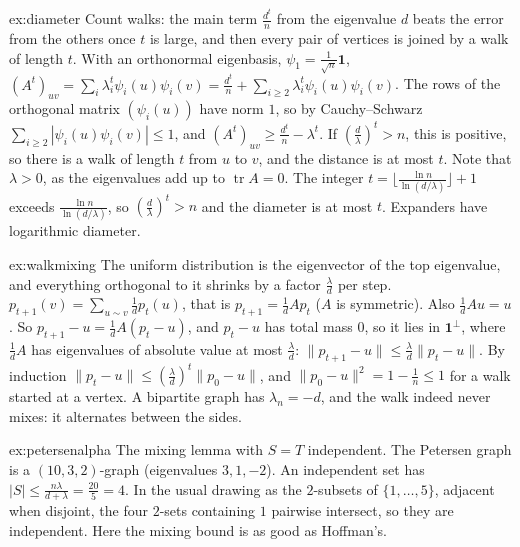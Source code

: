 \begin{solution}{ex:diameter}
\idea Count walks: the main term $\frac{d^t}n$ from the eigenvalue $d$ beats the error from the others once $t$ is large, and then every pair of vertices is joined by a walk of length $t$.
\writeup With an orthonormal eigenbasis, $\psi_1=\frac1{\sqrt n}\mathbf1$, $(A^t)_{uv}=\sum_i\lambda_i^t\psi_i(u)\psi_i(v)=\frac{d^t}n+\sum_{i\ge2}\lambda_i^t\psi_i(u)\psi_i(v)$. The rows of the orthogonal matrix $(\psi_i(u))$ have norm $1$, so
by Cauchy--Schwarz $\sum_{i\ge2}|\psi_i(u)\psi_i(v)|\le1$, and $(A^t)_{uv}\ge\frac{d^t}n-\lambda^t$. If $(\frac d\lambda)^t>n$, this is positive, so there is a walk of length $t$ from $u$ to $v$, and the distance is
at most $t$. Note that $\lambda>0$, as the eigenvalues add up to $\operatorname{tr}A=0$. The integer $t=\lfloor\frac{\ln n}{\ln(d/\lambda)}\rfloor+1$ exceeds $\frac{\ln n}{\ln(d/\lambda)}$, so $(\frac d\lambda)^t>n$ and the diameter is at most $t$. Expanders have logarithmic diameter.
\end{solution}

\begin{solution}{ex:walkmixing}
\idea The uniform distribution is the eigenvector of the top eigenvalue, and everything orthogonal to it shrinks by a factor $\frac\lambda d$ per step.
\writeup $p_{t+1}(v)=\sum_{u\sim v}\frac1dp_t(u)$, that is $p_{t+1}=\frac1dAp_t$ ($A$ is symmetric). Also $\frac1dAu=u$. So $p_{t+1}-u=\frac1dA(p_t-u)$, and $p_t-u$ has total mass $0$, so it lies in $\mathbf1^\perp$, where
$\frac1dA$ has eigenvalues of absolute value at most $\frac\lambda d$: $\|p_{t+1}-u\|\le\frac\lambda d\|p_t-u\|$. By induction $\|p_t-u\|\le(\frac\lambda d)^t\|p_0-u\|$, and $\|p_0-u\|^2=1-\frac1n\le1$ for a walk started at a vertex. A bipartite
graph has $\lambda_n=-d$, and the walk indeed never mixes: it alternates between the sides.
\end{solution}

\begin{solution}{ex:petersenalpha}
\idea The mixing lemma with $S=T$ independent.
\writeup The Petersen graph is a $(10,3,2)$-graph (eigenvalues $3,1,-2$). An independent set has $|S|\le\frac{n\lambda}{d+\lambda}=\frac{20}5=4$. In the usual drawing as the $2$-subsets of $\{1,\dots,5\}$, adjacent when disjoint,
the four $2$-sets containing $1$ pairwise intersect, so they are independent. Here the mixing bound is as good as Hoffman's.
\end{solution}


